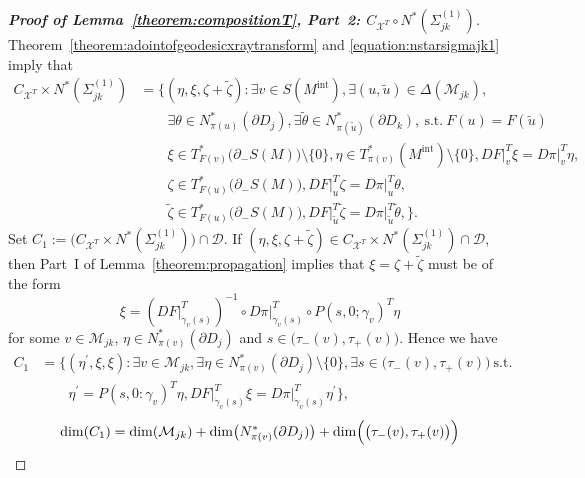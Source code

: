 \documentclass[a4paper,11pt,reqno]{amsart}
\numberwithin{equation}{section}
\theoremstyle{definition}
\theoremstyle{remark}
\begin{document}
\begin{proof}[{\bf Proof of Lemma~\ref{theorem:compositionT}, Part~2: $C_{\mathcal{X}^T}{\circ}N^\ast(\Sigma_{jk}^{(1)})$}]
Theorem~\ref{theorem:adointofgeodesicxraytransform} and \eqref{equation:nstarsigmajk1} imply that  
%
%
\begin{align*}
  C_{\mathcal{X}^T}{\times}N^\ast(\Sigma_{jk}^{(1)})
& =
  \bigl\{
  (\eta,\xi,\zeta+\tilde{\zeta}): 
  \exists v \in S(M^\text{int}), 
  \exists (u,\tilde{u}) \in \Delta(\mathcal{M}_{jk}), 
\\
& \qquad
  \exists \theta \in N^\ast_{\pi(u)}(\partial{D_j}), 
  \exists \tilde{\theta} \in N^\ast_{\pi(\tilde{u})}(\partial{D_k}), 
  \ \text{s.t.}\ F(u)=F(\tilde{u})
\\
& \qquad
  \xi \in T^\ast_{F(v)}\bigl(\partial_-S(M)\bigr)\setminus\{0\}, 
  \eta \in T^\ast_{\pi(v)}(M^\text{int})\setminus\{0\}, 
  DF\vert^T_v\xi=D\pi\vert^T_v\eta,
\\
& \qquad
  \zeta \in T^\ast_{F(u)}\bigl(\partial_-S(M)\bigr), 
  DF\vert^T_u\zeta=D\pi\vert^T_u\theta,
\\
& \qquad
  \tilde{\zeta} \in T^\ast_{F(u)}\bigl(\partial_-S(M)\bigr), 
  DF\vert^T_{\tilde{u}}\tilde{\zeta}=D\pi\vert^T_{\tilde{u}}\tilde{\theta},  
  \bigr\}. 
\end{align*}
%
% 
Set $C_1:=\bigl(C_{\mathcal{X}^T}{\times}N^\ast(\Sigma_{jk}^{(1)})\bigr)\cap\mathcal{D}$. 
If $(\eta,\xi,\zeta+\tilde{\zeta}) \in C_{\mathcal{X}^T}{\times}N^\ast(\Sigma_{jk}^{(1)}){\cap}\mathcal{D}$, 
then Part~I of Lemma~\ref{theorem:propagation} implies that $\xi=\zeta+\tilde{\zeta}$ must be of the form 
%
%
$$
\xi
=
(DF\vert^T_{\dot{\gamma}_v(s)})^{-1}
{\circ}
D\pi\vert^T_{\dot{\gamma}_v(s)}
{\circ}
P(s,0;\gamma_v)^T\eta
$$
%
%
for some $v \in \mathcal{M}_{jk}$, $\eta \in N^\ast_{\pi(v)}(\partial{D_j})$ and  $s\in\bigl(\tau_-(v),\tau_+(v)\bigr)$. 
Hence we have 
%
%
\begin{align*}
  C_1
& =
  \bigl\{
  (\eta^\prime,\xi,\xi):
  \exists v \in \mathcal{M}_{jk}, 
  \exists \eta \in N^\ast_{\pi(v)}(\partial{D_j})\setminus\{0\}, 
  \exists s \in \bigl(\tau_-(v),\tau_+(v)\bigr)
  \ \text{s.t.}\
\\ 
& \qquad
  \eta^\prime=P(s,0:\gamma_v)^T\eta, 
  DF\vert^T_{\dot{\gamma}_v(s)}\xi=D\pi\vert^T_{\dot{\gamma}_v(s)}\eta^\prime
  \bigr\}, 
\end{align*}
%
%
$$
\operatorname{dim}(C_1)
=
\operatorname{dim}(\mathcal{M}_{jk})
+
\operatorname{dim}\bigl(N^\ast_{\pi(v)}(\partial{D_j})\bigr)
+
\operatorname{dim}\Bigl(\bigl(\tau_-(v),\tau_+(v)\bigr)\Bigr)
$$
\end{proof}
\end{document}
